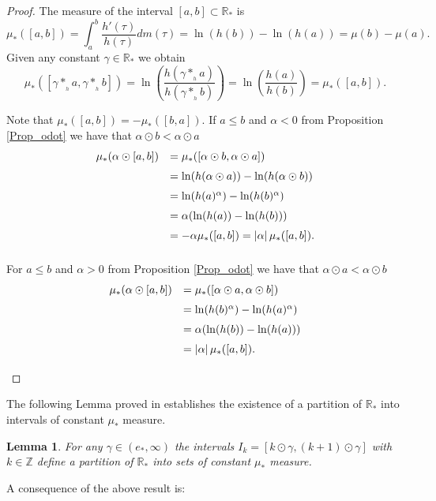 \documentclass[10pt]{amsart}
\newtheorem{lemma}{Lemma}
\numberwithin{equation}{section}
\begin{document}
\begin{proof}
The measure of the interval $[a,b] \subset \mathbb{R}_*$ is
$$
\mu_*([a, b]) = \int_a^b \frac{h'(\tau)}{h(\tau)} dm(\tau) = \ln(h(b)) - \ln(h(a)) = \mu(b) - \mu(a).
$$  
Given any constant $\gamma \in \mathbb{R}_*$ we obtain
$$
\mu_*([\gamma *_{_h} a,\gamma *_{_h} b]) = \ln\left( \frac{h(\gamma*_{_h}a)}{h(\gamma*_{_h}b)}\right) = \ln\left( \frac{h(a)}{h(b)}\right) = \mu_*([a, b]).$$



Note that $\mu_*([a, b]) = -\mu_*([b, a]).$ If $a\le b$ and  $\alpha < 0$ from Proposition \ref{Prop_odot} we have that  $\alpha \odot b < \alpha  \odot a$
$$
\begin{array}{rl}
\medskip
\mu_*(\alpha \odot [a, b]) & = \mu_*([\alpha \odot b, \alpha \odot a]) \\
\medskip
& = \ln(h(\alpha \odot a)) - \ln(h(\alpha \odot b)) \\
\medskip
&= \ln(h(a)^\alpha) - \ln(h(b)^\alpha) \\
\medskip
&= \alpha (\ln(h(a)) - \ln(h(b))) \\
\medskip
&= -\alpha \mu_*([a,b]) = |\alpha| \, \mu_*([a,b]). 
\end{array}
$$   

For $a\le b$ and  $\alpha > 0$ from Proposition \ref{Prop_odot} we have that  $\alpha \odot a < \alpha  \odot b$
$$
\begin{array}{rl}
\medskip
\mu_*(\alpha \odot [a, b]) & = \mu_*([\alpha \odot a, \alpha \odot b]) \\
\medskip
&= \ln(h(b)^\alpha) - \ln(h(a)^\alpha) \\
\medskip
&= \alpha (\ln(h(b)) - \ln(h(a))) \\
\medskip
&=  |\alpha| \, \mu_*([a,b]).
\end{array}
$$   


\end{proof}

The following Lemma proved in \cite{JFP} establishes the existence of a partition of $\mathbb{R}_*$ into intervals of
constant $\mu_*$ measure. 

\begin{lemma}
For any $\gamma \in (e_*, \infty)$ the intervals $I_k= [k \odot \gamma, (k+1) \odot \gamma]$ with $k \in \mathbb{Z}$ define a partition of $\mathbb{R}_*$ into sets of constant $\mu_*$ measure.
\end{lemma}

A consequence of the above result is:
\end{document}
